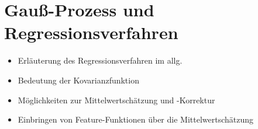 \section{Gauß-Prozess und Regressionsverfahren}
	\begin{itemize}
		\item Erläuterung des Regressionsverfahren im allg.
		\item Bedeutung der Kovarianzfunktion
		\item Möglichkeiten zur Mittelwertschätzung und -Korrektur
		\item Einbringen von Feature-Funktionen über die Mittelwertschätzung
	\end{itemize}